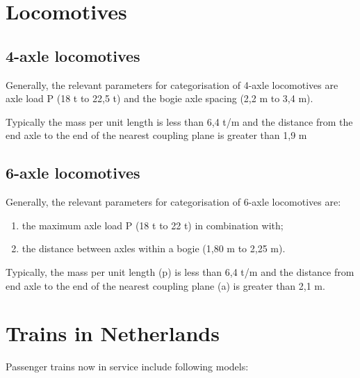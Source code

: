 \begin{appendices}
\section{Locomotives}
\subsection{4-axle locomotives}
Generally, the relevant parameters for categorisation of 4-axle locomotives are axle load P (18 t to 22,5 t) and the bogie axle spacing (2,2 m to 3,4 m).

Typically the mass per unit length is less than 6,4 t/m and the distance from the end axle to the end of the nearest coupling plane is greater than 1,9 m

\subsection{6-axle locomotives}

Generally, the relevant parameters for categorisation of 6-axle locomotives are:

\begin{enumerate}[-]
\item the maximum axle load P (18 t to 22 t) in combination with;
\item the distance between axles within a bogie (1,80 m to 2,25 m).
\end{enumerate}

Typically, the mass per unit length (p) is less than 6,4 t/m and the distance from end axle to the end of the nearest coupling plane (a) is greater than 2,1 m.

\section{Trains in Netherlands}

Passenger trains now in service include following models:


\end{appendices}
